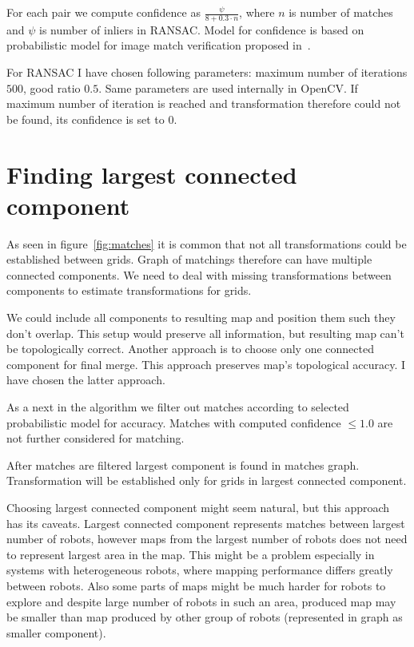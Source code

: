 For each pair we compute confidence as $\frac{\psi}{8 + 0.3 \cdot n}$, where $n$ is number of matches and $\psi$ is number of inliers in \gls{RANSAC}. Model for confidence is based on probabilistic model for image match verification proposed in~\cite{Brown2006}.

For \gls{RANSAC} I have chosen following parameters: maximum number of iterations $500$, good ratio $0.5$. Same parameters are used internally in \gls{OpenCV}. If maximum number of iteration is reached and transformation therefore could not be found, its confidence is set to $0$.


\section{Finding largest connected component} %
\label{sec:finding_largest_connected_component}

As seen in figure~\ref{fig:matches} it is common that not all transformations could be established between grids. Graph of matchings therefore can have multiple connected components. We need to deal with missing transformations between components to estimate transformations for grids.

We could include all components to resulting map and position them such they don't overlap. This setup would preserve all information, but resulting map can't be topologically correct. Another approach is to choose only one connected component for final merge. This approach preserves map's topological accuracy. I have chosen the latter approach.

As a next in the algorithm we filter out matches according to selected probabilistic model for accuracy. Matches with computed confidence $\le 1.0$ are not further considered for matching.

After matches are filtered largest component is found in matches graph. Transformation will be established only for grids in largest connected component.

Choosing largest connected component might seem natural, but this approach has its caveats. Largest connected component represents matches between largest number of robots, however maps from the largest number of robots does not need to represent largest area in the map. This might be a problem especially in systems with heterogeneous robots, where mapping performance differs greatly between robots. Also some parts of maps might be much harder for robots to explore and despite large number of robots in such an area, produced map may be smaller than map produced by other group of robots (represented in graph as smaller component).

